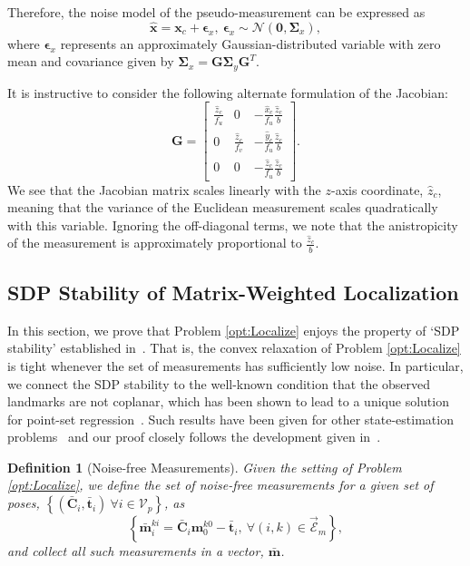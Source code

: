 \documentclass[lettersize,journal]{IEEEtran}
\newcommand{\EdgeSet}{\vec{\bm{\mathcal{E}}}}
\newcommand{\VertSetP}{\bm{\mathcal{V}}_p}
\newtheorem{definition}[theorem]{Definition}
\begin{document}
Therefore, the noise model of the pseudo-measurement can be expressed as
\begin{equation}
	 \hat{\bm{x}} = \bm{x}_c + \bm{\epsilon}_x, ~ \bm{\epsilon}_x \sim \mathcal{N}(\bm{0}, \bm{\Sigma}_x),
\end{equation}
where $ \bm{\epsilon}_x $ represents an approximately Gaussian-distributed variable with zero mean and covariance given by $ \bm{\Sigma}_x = \bm{G}\bm{\Sigma}_y \bm{G}^T $.

It is instructive to consider the following alternate formulation of the Jacobian:
\begin{equation}\label{eqn:stereo_jac}
	\bm{G} =\begin{bmatrix}
		\frac{\hat{z}_c}{f_u} & 0 & -\frac{\hat{x}_c}{f_u }\frac{\hat{z}_c}{b} \\
		0 & \frac{\hat{z}_c}{f_v } & -\frac{\hat{y}_c}{f_u }\frac{\hat{z}_c}{b} \\
		0 & 0 & -\frac{\hat{z}_c}{f_u}\frac{\hat{z}_c}{b}
	\end{bmatrix}.
\end{equation}
We see that the Jacobian matrix scales linearly with the $z$-axis coordinate, $\hat{z}_c$, meaning that the variance of the Euclidean measurement scales quadratically with this variable. Ignoring the off-diagonal terms, we note that the anistropicity of the measurement is approximately proportional to $\frac{\hat{z}_c}{b}$.

\subsection{SDP Stability of Matrix-Weighted Localization}\label{App:SDPStability}

In this section, we prove that Problem \eqref{opt:Localize} enjoys the property of `SDP stability' established in~\cite{cifuentesLocalStabilitySemidefinite2022}. That is, the convex relaxation of Problem \eqref{opt:Localize} is tight whenever the set of measurements has sufficiently low noise. In particular, we connect the SDP stability to the well-known condition that the observed landmarks are not coplanar, which has been shown to lead to a unique solution for point-set regression~\cite{arunLeastSquaresFittingTwo1987}. Such results have been given for other state-estimation problems~\cite{rosenSESyncCertifiablyCorrect2019, tianDistributedCertifiablyCorrect2021} and our proof closely follows the development given in~\cite{wiseCertifiablyOptimalMonocular2020}.

\begin{definition}[Noise-free Measurements]
	Given the setting of Problem \eqref{opt:Localize}, we define the set of \emph{noise-free measurements} for a given set of poses, $\left\{(\bar{\bm{C}}_{i}, \bar{\bm{t}}_i) ~ \forall i \in \VertSetP \right\}$, as
	\begin{equation}
		\left\{\bar{\bm{m}}_i^{ki} = \bar{\bm{C}}_{i} \bm{m}_0^{k0} - \bar{\bm{t}}_i,~ \forall (i,k)\in \EdgeSet_m\right\},
	\end{equation}
	and collect all such measurements in a vector, $\bar{\bm{m}}$.
\end{definition}
\end{document}
